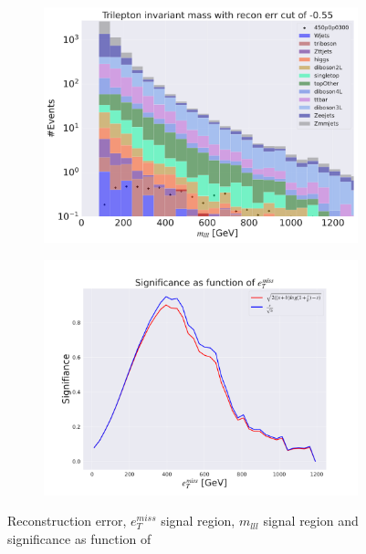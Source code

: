 \begin{figure}[H]
    \hfill
    \begin{subfigure}{.40\textwidth}
        \includegraphics[width=\textwidth]{Figures/VAE_testing/big/3lep/b_data_recon_big_rm3_feats_sig_450p0p0300_mlll_recon_errcut_-0.55.pdf}
        \caption{}
        \label{fig:VAE_3lep_big_mlll_450_3}
    \end{subfigure}
    \hfill   
    \begin{subfigure}{.40\textwidth}
        \includegraphics[width=\textwidth]{Figures/VAE_testing/big/3lep/significance_etmiss_450p0p0300_-0.5484574357785665.pdf}
        \caption{}
        \label{fig:VAE_3lep_big_signi_450_3}
    \end{subfigure}
    \hfill      
    \caption[3lep deep network | $450p300$ | VAE | 3]{Reconstruction error, $e_T^{miss}$ signal region, $m_{lll}$ signal region and significance as function of 
}
\end{figure}

